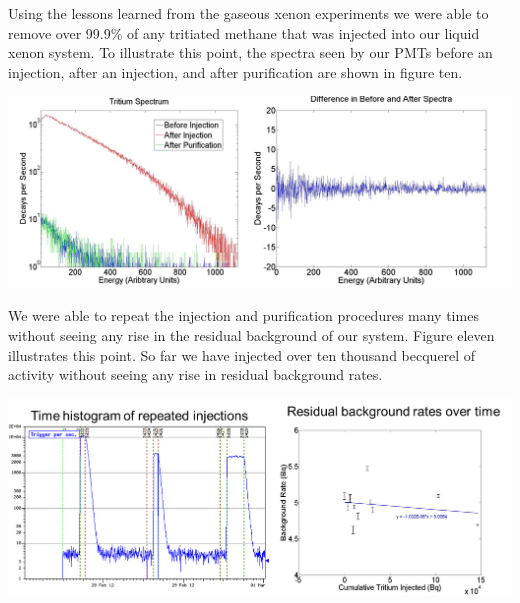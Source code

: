 \documentclass[a4paper,12pt]{article}
\begin{document}
Using the lessons learned from the gaseous xenon experiments we were able to remove over 99.9\% of any tritiated methane that was injected into our liquid xenon system.  To illustrate this point, the spectra seen by our PMTs before an injection, after an injection, and after purification are shown in figure ten.

\begin{center}
\includegraphics[scale=0.5]{spectra.png}
\end{center}


We were able to repeat the injection and purification procedures many times without seeing any rise in the residual background of our system.  Figure eleven illustrates this point.  So far we have injected over ten thousand becquerel of activity without seeing any rise in residual background rates.

\begin{center}
\includegraphics[scale=0.5]{backgrounds.png}
\end{center}
\end{document}
